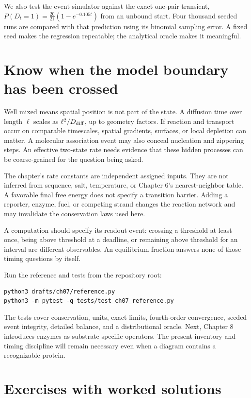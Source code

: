 We also test the event simulator against the exact one-pair transient,
$P(D_t=1)=\frac{20}{21}(1-e^{-0.105t})$ from an unbound start.
Four thousand seeded runs are compared with that prediction using its
binomial sampling error. A fixed seed makes the regression repeatable;
the analytical oracle makes it meaningful.

\section{Know when the model boundary has been crossed}

Well mixed means spatial position is not part of the state. A diffusion
time over length $\ell$ scales as $\ell^2/D_{\rm diff}$, up to geometry
factors. If reaction and transport occur on comparable timescales,
spatial gradients, surfaces, or local depletion can matter. A molecular
association event may also conceal nucleation and zippering steps.
An effective two-state rate needs evidence that these hidden processes
can be coarse-grained for the question being asked.

The chapter's rate constants are independent assigned inputs. They are
not inferred from sequence, salt, temperature, or Chapter 6's nearest-neighbor
table. A favorable final free energy does not specify a transition barrier.
Adding a reporter, enzyme, fuel, or competing strand changes the reaction
network and may invalidate the conservation laws used here.

A computation should specify its readout event: crossing a threshold
at least once, being above threshold at a deadline, or remaining above
threshold for an interval are different observables. An equilibrium
fraction answers none of those timing questions by itself.

Run the reference and tests from the repository root:
\begin{Verbatim}[fontsize=\small]
python3 drafts/ch07/reference.py
python3 -m pytest -q tests/test_ch07_reference.py
\end{Verbatim}
The tests cover conservation, units, exact limits, fourth-order convergence,
seeded event integrity, detailed balance, and a distributional oracle.
Next, Chapter 8 introduces enzymes as substrate-specific operators.
The present inventory and timing discipline will remain necessary even
when a diagram contains a recognizable protein.

\section{Exercises with worked solutions}

